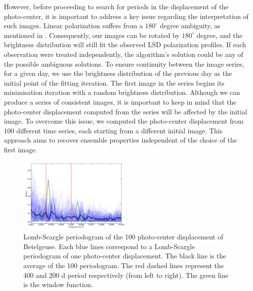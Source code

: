 \documentclass{aa}
\begin{document}
However, before proceeding to search for periods in the displacement of the photo-center, it is important to address a key issue regarding the interpretation of such images. 
Linear polarization suffers from a $180 ^\circ$ degree ambiguity, as mentioned in \cite{auriere_discovery_2016}. Consequently, our images 
can be 
rotated by $180^\circ$ degree, and the brightness distribution will still fit the observed LSD polarization profiles. 
If each observation were treated independently, the algorithm's solution could be any of the possible ambiguous solutions. To ensure continuity 
between the image series, 
for a given day, we use the brightness distribution of the previous day as the initial point 
of the  fitting iteration. The first image in the series begins its minimisation iteration with a random brightness distribution. 
Although we can produce a series of consistent images, it is important to keep in mind that the photo-center displacement computed from the series 
will be affected by the initial image. 
To overcome this issue, we computed
the photo-center displacement from 100 different time series, each starting from a different initial image. This approach aims to recover ensemble properties independent of the choice of the first image. 

\begin{figure}[!h]
    \centering
    \includegraphics[width=0.5\textwidth]{Lomb-Scargle Photo-center.pdf}
    \caption{Lomb-Scargle periodogram of the 100 photo-center displacement of Betelgeuse. Each blue lines correspond to a Lomb-Scargle periodogram of one photo-center
     displacement. The black line is the average of the 100 periodogram. The red dashed lines represent the 400 and 200 d period respectively 
     (from left to right). The green line is the window function.}
    \label{LS photocenter}
\end{figure}
\end{document}
